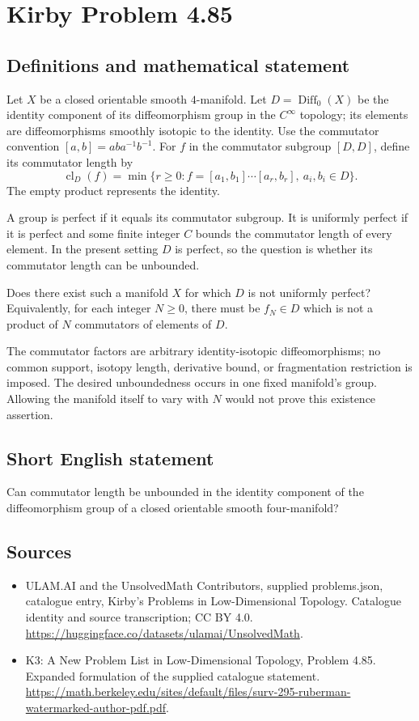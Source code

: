 \documentclass[11pt,a4paper]{article}
\begin{document}
\section*{Kirby Problem 4.85}\label{statement}

\subsection{Definitions and mathematical statement}
Let $X$ be a closed orientable smooth $4$-manifold. Let
$D=\operatorname{Diff}_0(X)$ be the identity component of its
diffeomorphism group in the $C^\infty$ topology; its elements are
diffeomorphisms smoothly isotopic to the identity.
Use the commutator convention $[a,b]=aba^{-1}b^{-1}$.
For $f$ in the commutator subgroup $[D,D]$, define its commutator
length by
\[
 \operatorname{cl}_D(f)=\min\{r\ge0:
           f=[a_1,b_1]\cdots[a_r,b_r],\ a_i,b_i\in D\}.
\]
The empty product represents the identity.

A group is perfect if it equals its commutator subgroup. It is
uniformly perfect if it is perfect and some finite integer $C$
bounds the commutator length of every element. In the present
setting $D$ is perfect, so the question is whether its commutator
length can be unbounded.

Does there exist such a manifold $X$ for which $D$ is not
uniformly perfect? Equivalently, for each integer $N\ge0$, there
must be $f_N\in D$ which is not a product of $N$ commutators
of elements of $D$.

The commutator factors are arbitrary identity-isotopic diffeomorphisms;
no common support, isotopy length, derivative bound, or fragmentation
restriction is imposed. The desired unboundedness occurs in one
fixed manifold's group. Allowing the manifold itself to vary with
$N$ would not prove this existence assertion.
\subsection{Short English statement}
Can commutator length be unbounded in the identity component of the diffeomorphism group of a closed orientable smooth four-manifold?
\subsection{Sources}
\begin{itemize}
\item[S1] ULAM.AI and the UnsolvedMath Contributors, supplied problems.json, catalogue entry, Kirby's Problems in Low-Dimensional Topology. Catalogue identity and source transcription; CC BY 4.0.
\url{https://huggingface.co/datasets/ulamai/UnsolvedMath}.
\item[S2] K3: A New Problem List in Low-Dimensional Topology, Problem 4.85. Expanded formulation of the supplied catalogue statement.
\url{https://math.berkeley.edu/sites/default/files/surv-295-ruberman-watermarked-author-pdf.pdf}.
\end{itemize}
\end{document}
